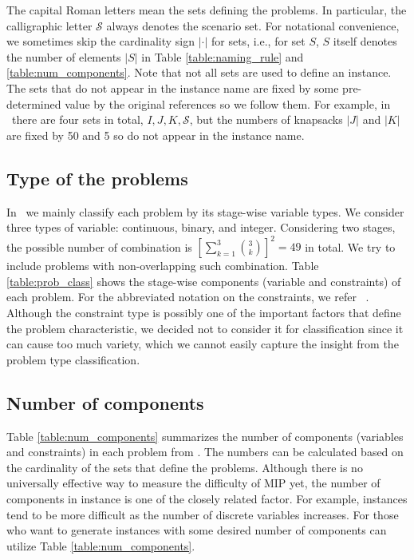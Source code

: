 The capital Roman letters mean the sets defining the problems. In particular, the calligraphic letter $\mathcal{S}$ always denotes the scenario set. For notational convenience, we sometimes skip the cardinality sign $|\cdot|$ for sets, i.e., for set $S$, $S$ itself denotes the number of elements $|S|$ in Table \ref{table:naming_rule} and \ref{table:num_components}. Note that not all sets are used to define an instance. The sets that do not appear in the instance name are fixed by some pre-determined value by the original references so we follow them. For example, in \smkp\ there are four sets in total, $I,J,K,\mathcal{S}$, but the numbers of knapsacks $|J|$ and $|K|$ are fixed by 50 and 5 so do not appear in the instance name.


\subsection{Type of the problems}
In \siplibtwo\, we mainly classify each problem by its stage-wise variable types. We consider three types of variable: continuous, binary, and integer. Considering two stages, the possible number of combination is $\left[\sum_{k=1}^3\binom{3}{k}\right]^2=49$ in total. We try to include problems with non-overlapping such combination. Table \ref{table:prob_class} shows the stage-wise components (variable and constraints) of each problem. For the abbreviated notation on the constraints, we refer \miplib\ \cite{MIPLIB}. Although the constraint type is possibly one of the important factors that define the problem characteristic, we decided not to consider it for classification since it can cause too much variety, which we cannot easily capture the insight from the problem type classification. 


\subsection{Number of components}
Table \ref{table:num_components} summarizes the number of components (variables and constraints) in each problem from \siplibtwo. The numbers can be calculated based on the cardinality of the sets that define the problems. Although there is no universally effective way to measure the difficulty of MIP yet, the number of components in instance is one of the closely related factor. For example, instances tend to be more difficult as the number of discrete variables increases. For those who want to generate instances with some desired number of components can utilize Table \ref{table:num_components}.



